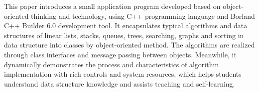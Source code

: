 \begin{upcabstracten}
 This paper introduces a small application program developed based on object-oriented thinking and technology, using C++ programming language and Borland C++ Builder 6.0 development tool. It encapsulates typical algorithms and data structures of linear lists, stacks, queues, trees, searching, graphs and sorting in data structure into classes by object-oriented method. The algorithms are realized through class interfaces and message passing between objects. Meanwhile, it dynamically demonstrates the process and characteristics of algorithm implementation with rich controls and system resources, which helps students understand data structure knowledge and assists teaching and self-learning.
\end{upcabstracten}
